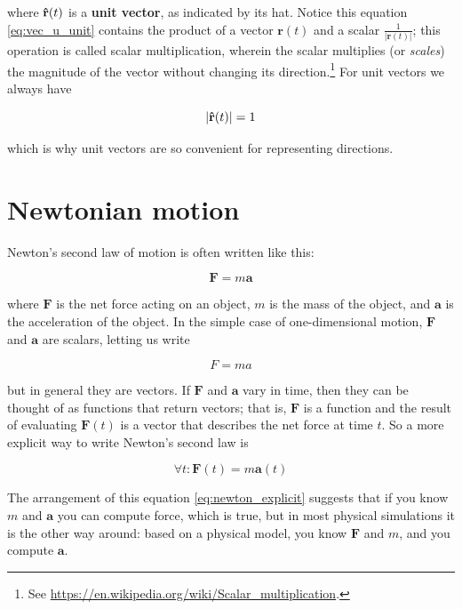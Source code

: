 \documentclass[
]{book}
\numberwithin{Answer}{chapter}
\numberwithin{Exercise}{chapter}
\renewcommand{\vec}[1]{\bm{\mathbf{#1}}}
\newcommand{\uveci}{{\bm{\hat{\textnormal{\bfseries\i}}}}}
\newcommand{\uvecj}{{\bm{\hat{\textnormal{\bfseries\j}}}}}
\newcommand{\uvec}[1]{%
    \ifthenelse{\equal{#1}{i}}%
        {\uveci}{%
    \ifthenelse{\equal{#1}{j}}%
        {\uvecj}{%
    {\bm{\hat{\mathbf{#1}}}}%
}}}
\newcommand{\norm}[1]{\lvert #1 \rvert}
\begin{document}
where $\uvec{r}(t)$ is a {\bf unit vector}, as indicated by its hat.
Notice this equation \eqref{eq:vec_u_unit} contains the product of a
vector $\vec{r}(t)$ and a scalar $\frac{1}{\norm{\vec{r}(t)}}$; this
operation is called scalar multiplication, wherein the scalar multiplies
(or \textit{scales}) the magnitude of the vector without changing its
direction.\footnote{See
\url{https://en.wikipedia.org/wiki/Scalar_multiplication}.} For unit vectors
we always have

\begin{equation}
    \norm{\uvec{r}(t)} = 1
\end{equation}

which is why unit vectors are so convenient for representing directions.

\section{Newtonian motion}

Newton's second law of motion is often written like this:

\begin{equation}
    \vec{F} = m \vec{a}
\end{equation}

where $\vec{F}$ is the net force acting on an object, $m$ is the
mass of the object, and $\vec{a}$ is the acceleration of the object.
In the simple case of one-dimensional motion,
$\vec{F}$ and $\vec{a}$ are scalars, letting us write

\begin{equation}
    F = m a
\end{equation}

but in general they are vectors. If $\vec{F}$ and $\vec{a}$ vary in time, then they can
be thought of as functions that return vectors; that is, $\vec{F}$ is
a function and the result of evaluating $\vec{F}(t)$ is a vector that
describes the net force at time $t$.  So a more explicit way to
write Newton's second law is

\begin{equation}\label{eq:newton_explicit}
\forall t: \vec{F}(t) = m \vec{a}(t)
\end{equation}

The arrangement of this equation \eqref{eq:newton_explicit} suggests
that if you know $m$ and $\vec{a}$ you can compute force, which is true,
but in most physical simulations it is the other way around:  based on a
physical model, you know $\vec{F}$ and $m$, and you compute $\vec{a}$.
\end{document}

